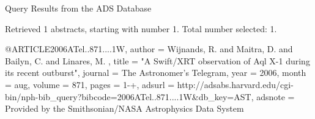 Query Results from the ADS Database


Retrieved 1 abstracts, starting with number 1.  Total number selected: 1.

@ARTICLE{2006ATel..871....1W,
   author = {{Wijnands}, R. and {Maitra}, D. and {Bailyn}, C. and {Linares}, M.
	},
    title = "{A Swift/XRT observation of Aql X-1 during its recent outburst}",
  journal = {The Astronomer's Telegram},
     year = 2006,
    month = aug,
   volume = 871,
    pages = {1-+},
   adsurl = {http://adsabs.harvard.edu/cgi-bin/nph-bib_query?bibcode=2006ATel..871....1W&db_key=AST},
  adsnote = {Provided by the Smithsonian/NASA Astrophysics Data System}
}


